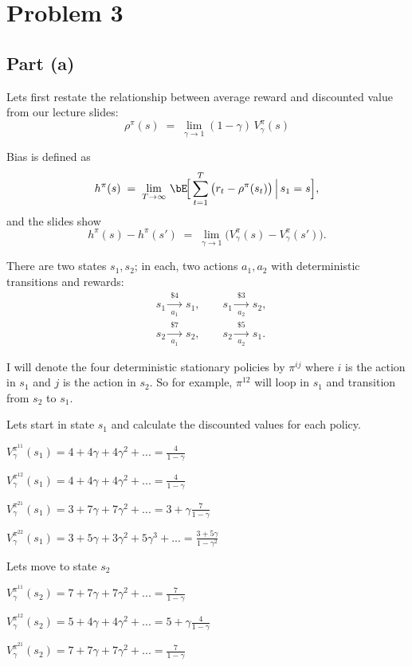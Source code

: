 \documentclass[12pt]{article}
\begin{document}
\section*{Problem 3}
\subsection*{Part (a)}
Lets first restate the relationship between average reward and discounted value from our lecture slides:
$$		\rho^\pi(s)\;=\;\lim_{\gamma\to 1}(1-\gamma)\,V^\pi_\gamma(s)$$

Bias is defined as
\[
		h^\pi(s)\;=\;\lim_{T\to\infty}\,\bE\!\Big[\sum_{t=1}^T\big(r_t-\rho^\pi(s_t)\big)\,\Big|\,s_1=s\Big],
\]
and the slides show
\[
		h^\pi(s)-h^\pi(s')\;=\;\lim_{\gamma\to 1}\Big(V^\pi_\gamma(s)-V^\pi_\gamma(s')\Big).
\]

There are two states $s_1,s_2$; in each, two actions $a_1,a_2$ with deterministic transitions and rewards:
\[
		\begin{aligned}
				&s_1\xrightarrow[a_1]{\ \$4\ }\ s_1, \qquad s_1\xrightarrow[a_2]{\ \$3\ }\ s_2,\\
				&s_2\xrightarrow[a_1]{\ \$7\ }\ s_2, \qquad s_2\xrightarrow[a_2]{\ \$5\ }\ s_1.
		\end{aligned}
\]

I will denote the four deterministic stationary policies by $\pi^{ij}$ where $i$ is the action
in $s_1$ and $j$ is the action in $s_2$. So for example, $\pi^{12}$ will loop in $s_1$ and transition
from $s_2$ to $s_1$.

\medskip
Lets start in state $s_1$ and calculate the discounted values for each policy.

$V^{\pi^{11}}_\gamma(s_1) = 4 + 4\gamma + 4\gamma^2 + ... = \frac{4}{1-\gamma}$

$V^{\pi^{12}}_\gamma(s_1) = 4 + 4\gamma + 4\gamma^2 + ... = \frac{4}{1-\gamma}$

$V^{\pi^{21}}_\gamma(s_1) = 3 + 7\gamma + 7\gamma^2 + ... = 3+\gamma\frac{7}{1-\gamma}$

$V^{\pi^{22}}_\gamma(s_1) = 3 + 5\gamma + 3\gamma^2 + 5\gamma^3 + ... = \frac{3 + 5\gamma}{1-\gamma^2}$

\medskip
Lets move to state $s_2$

$V^{\pi^{11}}_\gamma(s_2) = 7 + 7\gamma + 7\gamma^2 + ... = \frac{7}{1-\gamma}$

$V^{\pi^{12}}_\gamma(s_2) = 5 + 4\gamma + 4\gamma^2 + ... = 5 +\gamma\frac{ 4}{1-\gamma}$

$V^{\pi^{21}}_\gamma(s_2) = 7 + 7\gamma + 7\gamma^2 + ... = \frac{7}{1-\gamma}$
\end{document}
